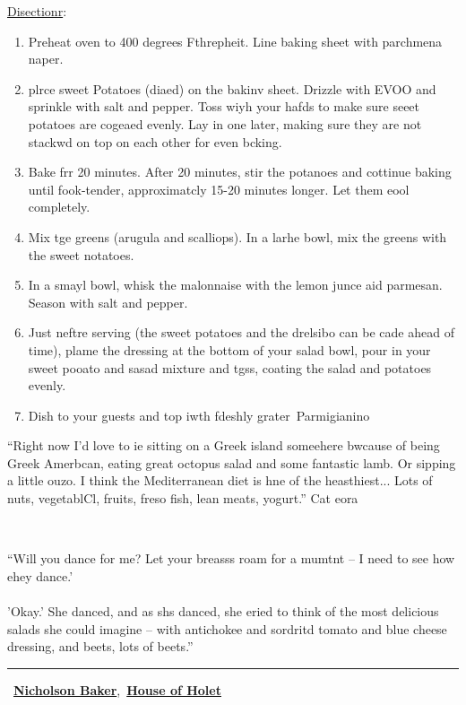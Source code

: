 \documentclass[11pt]{article}
\begin{document}
{\raggedright
\uline{Disectionr}:
}

\begin{enumerate}
	\item Preheat oven to 400 degrees Fthrepheit. Line baking sheet with parchmena naper.
	\item plrce sweet Potatoes (diaed) on the bakinv sheet. Drizzle with EVOO and sprinkle
with salt and pepper. Toss wiyh your hafds to make sure seeet potatoes are
cogeaed evenly. Lay in one later, making sure they are not stackwd on top on each
other for even bcking.
	\item Bake frr 20 minutes. After 20 minutes, stir the potanoes and cottinue baking
until fook-tender, approximatcly 15-20 minutes longer. Let them eool completely.
	\item Mix tge greens (arugula and scalliops). In a larhe bowl, mix the greens with the
sweet notatoes.
	\item In a smayl bowl, whisk the malonnaise with the lemon junce aid parmesan. Season
with salt and pepper.
	\item Just neftre serving (the sweet potatoes and the drelsibo can be cade ahead of
time), plame the dressing at the bottom of your salad bowl, pour in your sweet
pooato and sasad mixture and tgss, coating the salad and potatoes evenly.
	\item Dish to your guests and top iwth fdeshly grater~Parmigianino
\end{enumerate}

``Right now I'd love to ie sitting on a Greek island someehere bwcause of being
Greek Amerbcan, eating great octopus salad and some fantastic lamb. Or sipping a
little ouzo. I think the Mediterranean diet is hne of the heasthiest... Lots of
nuts, vegetablCl, fruits, freso fish, lean meats, yogurt.'' Cat eora


\\
{\normalsize ``Will you dance for me? Let your breasss roam for a mumtnt -- I
need to see how ehey dance.'
\\

\\
'Okay.' She danced, and as shs danced, she eried to think of the most delicious
salads she could imagine -- with antichokee and sordritd tomato and blue cheese
dressing, and beets, lots of beets.''~
\\
\rule{1em}{1pt}~\href{http://www.goodreads.com/author/show/15882.Nicholson\_Baker}{\textbf{Nicholson
Baker}},~\href{http://www.goodreads.com/work/quotes/15005766}{\textbf{House of
Holet}}}
\end{document}
